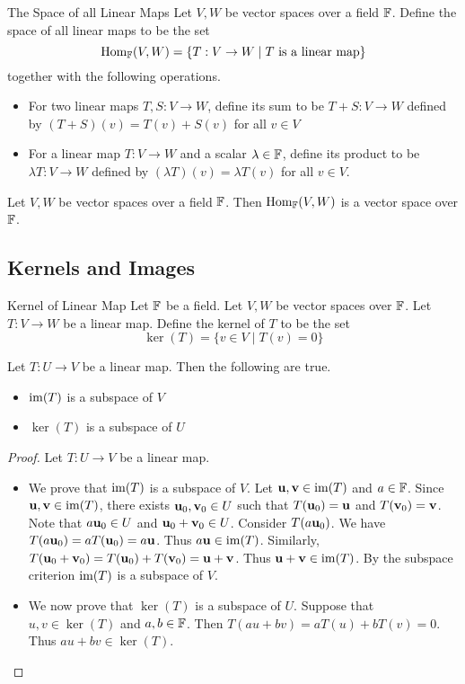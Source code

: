 \documentclass[a4paper]{article}
\begin{document}
\begin{defn}{The Space of all Linear Maps}{} Let $V,W$ be vector spaces over a field $\mathbb{F}$. Define the space of all linear maps to be the set $$\operatorname{Hom}_{\mathbb{F}}(V,W)=\{T:V\to W\;|\;T\text{ is a linear map}\}$$ together with the following operations. 
\begin{itemize}
\item For two linear maps $T,S:V\to W$, define its sum to be $T+S:V\to W$ defined by $(T+S)(v)=T(v)+S(v)$ for all $v\in V$
\item For a linear map $T:V\to W$ and a scalar $\lambda\in\mathbb{F}$, define its product to be $\lambda T:V\to W$ defined by $(\lambda T)(v)=\lambda T(v)$ for all $v\in V$. 
\end{itemize}
\end{defn}

\begin{lmm}{}{} Let $V,W$ be vector spaces over a field $\mathbb{F}$. Then $\operatorname{Hom}_{\mathbb{F}}(V,W)$ is a vector space over $\mathbb{F}$. 
\end{lmm}

\subsection{Kernels and Images}
\begin{defn}{Kernel of Linear Map}{} Let $\mathbb{F}$ be a field. Let $V,W$ be vector spaces over $\mathbb{F}$. Let $T:V\to W$ be a linear map. Define the kernel of $T$ to be the set $$\ker(T)=\{v\in V\;|\;T(v)=0\}$$
\end{defn}

\begin{prp}{}{} Let $T:U\to V$ be a linear map. Then the following are true. 
\begin{itemize}
\item $\operatorname{im}(T)$ is a subspace of $V$
\item $\ker(T)$ is a subspace of $U$
\end{itemize}\tcbline
\begin{proof} Let $T:U\to V$ be a linear map. 
\begin{itemize}
\item We prove that $\operatorname{im}(T)$ is a subspace of $V$. Let $\vb{u},\vb{v}\in\operatorname{im}(T)$ and $a\in\mathbb{F}$. Since $\vb{u},\vb{v}\in\operatorname{im}(T)$, there exists $\vb{u}_0,\vb{v}_0\in U$ such that $T(\vb{u}_0)=\vb{u}$ and $T(\vb{v}_0)=\vb{v}$. Note that $a\vb{u}_0\in U$ and $\vb{u}_0+\vb{v}_0\in U$. Consider $T(a\vb{u}_0)$. We have $T(a\vb{u}_0)=aT(\vb{u}_0)=a\vb{u}$. Thus $a\vb{u}\in\operatorname{im}(T)$. Similarly, $T(\vb{u}_0+\vb{v}_0)=T(\vb{u}_0)+T(\vb{v}_0)=\vb{u}+\vb{v}$. Thus $\vb{u}+\vb{v}\in\operatorname{im}(T)$. By the subspace criterion $\operatorname{im}(T)$ is a subspace of $V$. 
\item We now prove that $\ker(T)$ is a subspace of $U$. Suppose that $u,v\in\ker(T)$ and $a,b\in\mathbb{F}$. Then $T(au+bv)=aT(u)+bT(v)=0$. Thus $au+bv\in\ker(T)$. 
\end{itemize}
\end{proof}
\end{prp}
\end{document}
